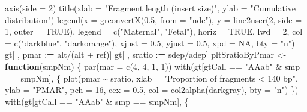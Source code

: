 \documentclass[11pt,letterpaper,oneside]{book}
\newenvironment{Shaded}{\begin{snugshade}}{\end{snugshade}}
\newcommand{\AttributeTok}[1]{\textcolor[rgb]{0.77,0.63,0.00}{#1}}
\newcommand{\ConstantTok}[1]{\textcolor[rgb]{0.00,0.00,0.00}{#1}}
\newcommand{\ControlFlowTok}[1]{\textcolor[rgb]{0.13,0.29,0.53}{\textbf{#1}}}
\newcommand{\DecValTok}[1]{\textcolor[rgb]{0.00,0.00,0.81}{#1}}
\newcommand{\ErrorTok}[1]{\textcolor[rgb]{0.64,0.00,0.00}{\textbf{#1}}}
\newcommand{\FloatTok}[1]{\textcolor[rgb]{0.00,0.00,0.81}{#1}}
\newcommand{\FunctionTok}[1]{\textcolor[rgb]{0.00,0.00,0.00}{#1}}
\newcommand{\NormalTok}[1]{#1}
\newcommand{\OtherTok}[1]{\textcolor[rgb]{0.56,0.35,0.01}{#1}}
\newcommand{\SpecialCharTok}[1]{\textcolor[rgb]{0.00,0.00,0.00}{#1}}
\newcommand{\StringTok}[1]{\textcolor[rgb]{0.31,0.60,0.02}{#1}}
\begin{document}
\begin{Shaded}
\begin{Highlighting}[]
\FunctionTok{axis}\NormalTok{(}\AttributeTok{side =} \DecValTok{2}\NormalTok{)}
\FunctionTok{title}\NormalTok{(}\AttributeTok{xlab =} \StringTok{"Fragment length (insert size)"}\NormalTok{,}
      \AttributeTok{ylab =} \StringTok{"Cumulative distribution"}\NormalTok{)}
\FunctionTok{legend}\NormalTok{(}\AttributeTok{x =} \FunctionTok{grconvertX}\NormalTok{(}\FloatTok{0.5}\NormalTok{, }\AttributeTok{from =} \StringTok{"ndc"}\NormalTok{),}
       \AttributeTok{y =} \FunctionTok{line2user}\NormalTok{(}\DecValTok{2}\NormalTok{, }\AttributeTok{side =} \DecValTok{1}\NormalTok{, }\AttributeTok{outer =} \ConstantTok{TRUE}\NormalTok{),}
       \AttributeTok{legend =} \FunctionTok{c}\NormalTok{(}\StringTok{"Maternal"}\NormalTok{, }\StringTok{"Fetal"}\NormalTok{),}
       \AttributeTok{horiz =} \ConstantTok{TRUE}\NormalTok{,}
       \AttributeTok{lwd =} \DecValTok{2}\NormalTok{,}
       \AttributeTok{col =} \FunctionTok{c}\NormalTok{(}\StringTok{"darkblue"}\NormalTok{, }\StringTok{"darkorange"}\NormalTok{),}
       \AttributeTok{xjust =} \FloatTok{0.5}\NormalTok{,}
       \AttributeTok{yjust =} \FloatTok{0.5}\NormalTok{,}
       \AttributeTok{xpd =} \ConstantTok{NA}\NormalTok{,}
       \AttributeTok{bty =} \StringTok{"n"}\NormalTok{)}
\NormalTok{gt[ , pmar }\SpecialCharTok{:}\ErrorTok{=}\NormalTok{ alt}\SpecialCharTok{/}\NormalTok{(alt }\SpecialCharTok{+}\NormalTok{ ref)]}
\NormalTok{gt[ , sratio }\SpecialCharTok{:}\ErrorTok{=}\NormalTok{ sdep}\SpecialCharTok{/}\NormalTok{adep]}
\NormalTok{pltSratioByPmar }\OtherTok{\textless{}{-}} \ControlFlowTok{function}\NormalTok{(smpNm) \{}
  \FunctionTok{par}\NormalTok{(}\AttributeTok{mar =} \FunctionTok{c}\NormalTok{(}\DecValTok{4}\NormalTok{, }\DecValTok{4}\NormalTok{, }\DecValTok{1}\NormalTok{, }\DecValTok{1}\NormalTok{))}
  \FunctionTok{with}\NormalTok{(gt[gtCall }\SpecialCharTok{==} \StringTok{"AAab"} \SpecialCharTok{\&}\NormalTok{ smp }\SpecialCharTok{==}\NormalTok{ smpNm], \{}
    \FunctionTok{plot}\NormalTok{(pmar }\SpecialCharTok{\textasciitilde{}}\NormalTok{ sratio,}
         \AttributeTok{xlab =} \StringTok{"Proportion of fragments \textless{} 140 bp"}\NormalTok{,}
         \AttributeTok{ylab =} \StringTok{"PMAR"}\NormalTok{,}
         \AttributeTok{pch =} \DecValTok{16}\NormalTok{,}
         \AttributeTok{cex =} \FloatTok{0.5}\NormalTok{,}
         \AttributeTok{col =} \FunctionTok{col2alpha}\NormalTok{(}\StringTok{\textquotesingle{}darkgray\textquotesingle{}}\NormalTok{),}
         \AttributeTok{bty =} \StringTok{"n"}\NormalTok{)}
\NormalTok{  \})}
  \FunctionTok{with}\NormalTok{(gt[gtCall }\SpecialCharTok{==} \StringTok{"AAab"} \SpecialCharTok{\&}\NormalTok{ smp }\SpecialCharTok{==}\NormalTok{ smpNm], \{}

\end{Highlighting}
\end{Shaded}
\end{document}
